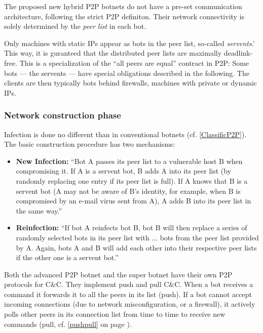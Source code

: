 \documentclass{llncs}
\begin{document}
The proposed new hybrid P2P botnets do not have a pre-set
communication architecture, following the strict P2P definiton. Their
network connectivity is solely determined by the {\it peer list} in
each bot.

Only machines with static IPs appear as bots in the peer list,
so-called {\it servents}.'\cite{td1sc} This way, it is guranteed that
the distributed peer lists are maximally deadlink-free.  This is a
specialization of the ``all peers are equal'' contract in P2P: Some
bots --- the servents --- have special obligations described in the
following.  The clients are then typically bots behind firewalls,
machines with private or dynamic IPs.

\subsubsection{Network construction phase}

Infection is done no different than in conventional botnets
(cf. \ref{ClassificP2P}). The basic construction procedure has two
mechanisms:
\begin{itemize}
\item {\bf New Infection:} ``Bot A passes its peer list to a
vulnerable host B when compromising it. If A is a
servent bot, B adds A into its peer list (by randomly
replacing one entry if its peer list is full). If A knows
that B is a servent bot (A may not be aware of
B’s identity, for example, when B is compromised by
an e-mail virus sent from A), A adds B into its peer
list in the same way.'' \cite{td1sc}
\item {\bf Reinfection:} ``If bot A
reinfects bot B, bot B will then replace \lbrack{}a series of\rbrack{} 
 randomly selected bots in its peer list with \lbrack{}...\rbrack{} bots
from the peer list provided by A. Again, bots A and B
will add each other into their respective peer lists if
the other one is a servent bot.''\cite{td1sc}
\end{itemize}

Both the advanced P2P botnet and the super botnet have their own P2P
protocols for C\&C. They implement push and pull
C\&C.\cite{wang2009systematic} When a bot receives a command it
forwards it to all the peers in its list (push). If a bot cannot
accept incoming connections (due to network misconfiguration, or a
firewall), it actively polls other peers in its connection list from
time to time to receive new commands (pull, cf. \ref{pushpull} on page
\pageref{pushpull}).
\end{document}
